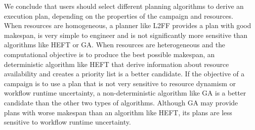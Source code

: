 We conclude that users should select different planning algorithms to derive an
execution plan, depending on the properties of the campaign and resources. When
resources are homogeneous, a planner like L2FF provides a plan with good
makespan, is very simple to engineer and is not significantly more sensitive
than algorithms like HEFT or GA. When resources are heterogeneous and the
computational objective is to produce the best possible makespan, an
deterministic algorithm like HEFT that derive information about resource
availability and creates a priority list is a better candidate. If the objective
of a campaign is to use a plan that is not very sensitive to resource dynamism
or workflow runtime uncertainty, a non-deterministic algorithm like GA is a
better candidate than the other two types of algorithms. Although GA may provide
plans with worse makespan than an algorithm like HEFT, its plans are less
sensitive to workflow runtime uncertainty.



%
%

